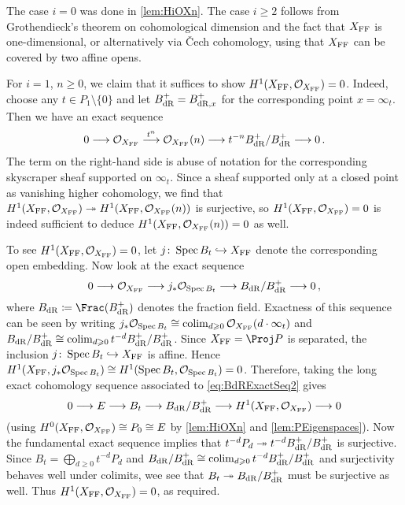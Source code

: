 \begin{proof*}
	The case $i=0$ was done in \cref{lem:HiOXn}. The case $i\geq 2$ follows from Grothendieck's theorem on cohomological dimension and the fact that $X_{\mathrm{FF}}$ is one-dimensional, or alternatively via \v Cech cohomology, using that $X_{\mathrm{FF}}$ can be covered by two affine opens.
	
	For $i=1$, $n\geq 0$, we claim that it suffices to show $H^1(X_{\mathrm{FF}},\mathcal{O}_{X_{\mathrm{FF}}})=0$. Indeed, choose any $t\in P_1\setminus\{0\}$ and let $B_{\mathrm{dR}}^+=B_{\mathrm{dR},x}^+$ for the corresponding point $x=\infty_t$. Then we have an exact sequence
	\begin{equation}\label{eq:BdRExactSeq1}
		0\morphism \Oo_{X_\FFC}\morphism[t^n]\Oo_{X_\FFC}(n)\morphism t^{-n}B_{\dR}^+/B_{\dR}^+\morphism 0\,.
	\end{equation}
	The term on the right-hand side is abuse of notation for the corresponding skyscraper sheaf supported on $\infty_t$. Since a sheaf supported only at a closed point as vanishing higher cohomology, we find that $H^1(X_\FFC,\Oo_{X_\FFC})\epimorphism H^1(X_\FFC,\Oo_{X_\FFC}(n))$ is surjective, so $H^1(X_{\mathrm{FF}},\mathcal{O}_{X_{\mathrm{FF}}})=0$ is indeed sufficient to deduce $H^1(X_{\mathrm{FF}},\mathcal{O}_{X_{\mathrm{FF}}}(n))=0$ as well.
	
	To see $H^1(X_{\mathrm{FF}},\mathcal{O}_{X_{\mathrm{FF}}})=0$, let $j\colon \Spec B_t\monomorphism X_\FFC$ denote the corresponding open embedding. Now look at the exact sequence
	\begin{equation}\label{eq:BdRExactSeq2}
		0\morphism \Oo_{X_\FFC}\morphism j_*\Oo_{\Spec B_t}\morphism B_{\dR}/B^+_\dR\morphism 0\,,
	\end{equation} 
	where $B_\dR\coloneqq \Frac(B^+_\dR)$ denotes the fraction field. Exactness of this sequence can be seen by writing $j_*\mathcal{O}_{\operatorname{Spec} B_t}\cong \operatorname*{colim}_{d\geqslant 0}\mathcal{O}_{X_{\mathrm{FF}}}(d\cdot \infty_t)$ and $B_{\mathrm{dR}}/B_{\mathrm{dR}}^+\cong \operatorname*{colim}_{d\geqslant 0}t^{-d}B_{\mathrm{dR}}^+/B_{\mathrm{dR}}^+$. Since $X_\FFC=\Proj P$ is separated, the inclusion $j\colon \Spec B_t\monomorphism X_\FFC$ is affine. Hence $H^1(X_{\mathrm{FF}},j_*\mathcal{O}_{\operatorname{Spec} B_t})\cong H^1(\operatorname{Spec} B_t,\mathcal{O}_{\operatorname{Spec} B_t})=0$. Therefore, taking the long exact cohomology sequence associated to \cref{eq:BdRExactSeq2} gives
	\begin{equation*}
		0\morphism E\morphism B_t\morphism B_\dR/B_\dR^+\morphism H^1(X_\FFC,\Oo_{X_\FFC})\morphism 0
	\end{equation*}
	(using $H^0(X_{\mathrm{FF}},\mathcal{O}_{X_{\mathrm{FF}}})\cong P_0\cong E$ by \cref{lem:HiOXn} and \cref{lem:PEigenspaces}). Now the fundamental exact sequence implies that $t^{-d}P_d\epimorphism t^{-d}B_\dR^+/B_\dR^+$ is surjective. Since $B_t=\bigoplus_{d\geq 0}t^{-d}P_d$ and $B_{\mathrm{dR}}/B_{\mathrm{dR}}^+\cong \operatorname*{colim}_{d\geqslant 0}t^{-d}B_{\mathrm{dR}}^+/B_{\mathrm{dR}}^+$ and surjectivity behaves well under colimits, wee see that $B_t\epimorphism B_\dR/B_\dR^+$ must be surjective as well. Thus $H^1(X_{\mathrm{FF}},\mathcal{O}_{X_{\mathrm{FF}}})=0$, as required.
	

\end{proof*}
